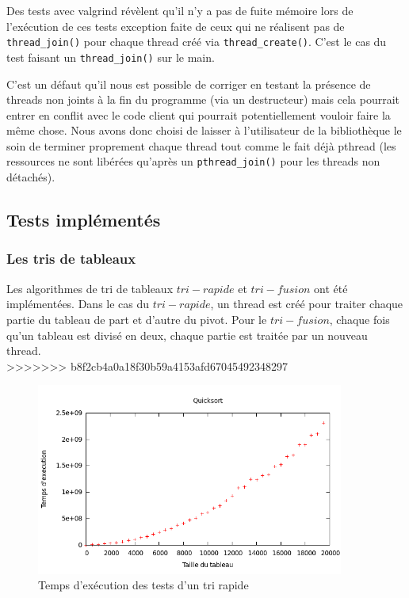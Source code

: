 Des tests avec valgrind révèlent qu'il n'y a pas de fuite mémoire lors de l'exécution de ces tests exception faite de ceux qui ne réalisent pas de \verb!thread_join()! pour chaque thread créé via \verb!thread_create()!. C'est le cas du test faisant un \verb!thread_join()! sur le main.

C'est un défaut qu'il nous est possible de corriger en testant la présence de threads non joints à la fin du programme (via un destructeur) mais cela pourrait entrer en conflit avec le code client qui pourrait potentiellement vouloir faire la même chose. Nous avons donc choisi de laisser à l'utilisateur de la bibliothèque le soin de terminer proprement chaque thread tout comme le fait déjà pthread (les ressources ne sont libérées qu'après un \verb!pthread_join()! pour les threads non détachés).


\subsection{Tests implémentés}

\subsubsection{Les tris de tableaux}
Les algorithmes de tri de tableaux $tri-rapide$ et $tri-fusion$ ont été implémentées. Dans le cas du $tri-rapide$, un thread est créé pour traiter chaque partie du tableau de part et d'autre du pivot. Pour le $tri-fusion$, chaque fois qu'un tableau est divisé en deux, chaque partie est traitée par un nouveau thread.\\
>>>>>>> b8f2cb4a0a18f30b59a4153afd67045492348297

\begin{figure}[H]
\centering
\includegraphics[width=0.9\textwidth]{quicksort.png}
\caption{Temps d'exécution des tests d'un tri rapide}
\label{fig:quicksort}
\end{figure}

